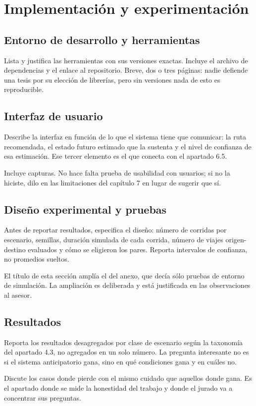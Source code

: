 \documentclass[letterpaper,12pt,oneside]{book}
\theoremstyle{definition}
\theoremstyle{plain}
\theoremstyle{remark}
\begin{document}
\chapter{Implementación y experimentación}
\section{Entorno de desarrollo y herramientas}
Lista y justifica las herramientas con sus versiones exactas. Incluye el archivo de dependencias y el enlace al repositorio. Breve, dos o tres páginas: nadie defiende una tesis por su elección de librerías, pero sin versiones nada de esto es reproducible.


\section{Interfaz de usuario}
Describe la interfaz en función de lo que el sistema tiene que comunicar: la ruta recomendada, el estado futuro estimado que la sustenta y el nivel de confianza de esa estimación. Ese tercer elemento es el que conecta con el apartado 6.5.

Incluye capturas. No hace falta prueba de usabilidad con usuarios; si no la hiciste, dilo en las limitaciones del capítulo 7 en lugar de sugerir que sí.

\section{Diseño experimental y pruebas}
Antes de reportar resultados, especifica el diseño: número de corridas por escenario, semillas, duración simulada de cada corrida, número de viajes origen-destino evaluados y cómo se eligieron los pares. Reporta intervalos de confianza, no promedios sueltos.

El título de esta sección amplía el del anexo, que decía sólo pruebas de entorno de simulación. La ampliación es deliberada y está justificada en las observaciones al asesor.

\section{Resultados}
Reporta los resultados desagregados por clase de escenario según la taxonomía del apartado 4.3, no agregados en un solo número. La pregunta interesante no es si el sistema anticipatorio gana, sino en qué condiciones gana y en cuáles no.

Discute los casos donde pierde con el mismo cuidado que aquellos donde gana. Es el apartado donde se mide la honestidad del trabajo y donde el jurado va a concentrar sus preguntas.
\end{document}
